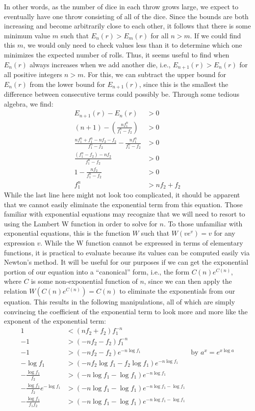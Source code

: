 \documentclass{article}
\begin{document}
In other words, as the number of dice in each throw grows large, we expect to eventually have one throw consisting of all of the dice.
Since the bounds are both increasing and become arbitrarily close to each other, it follows that there is some minimum value $m$ such that $E_n(r) > E_m(r)$ for all $n > m$.
If we could find this $m$, we would only need to check values less than it to determine which one minimizes the expected number of rolls.
Thus, it seems useful to find when $E_n(r)$ always increases when we add another die, i.e., $E_{n+1}(r) > E_n(r)$ for all positive integers $n > m$.
For this, we can subtract the upper bound for $E_n(r)$ from the lower bound for $E_{n+1}(r)$, since this is the smallest the difference between consecutive terms could possibly be.
Through some tedious algebra, we find:
\begin{align}
    E_{n+1}(r) - E_n(r) &> 0 \\
    (n + 1) - \left( \frac{nf_1^n}{f_1^n - f_2} \right) &> 0 \\
    \frac{nf_1^n + f_1^n-nf_2-f_2}{f_1^n-f_2} - \frac{nf_1^n}{f_1^n - f_2} &> 0 \\
    \frac{(f_1^n-f_2) - nf_2}{f_1^n-f_2} &> 0 \\
    1 - \frac{nf_2}{f_1^n-f_2} &> 0 \\
    f_1^n &>nf_2 + f_2
\end{align}
While the last line here might not look too complicated, it should be apparent that we cannot easily eliminate the exponential term from this equation.
Those familiar with exponential equations may recognize that we will need to resort to using the Lambert W function in order to solve for $n$.
To those unfamiliar with exponential equations, this is the function $W$ such that $W(ve^v)=v$ for any expression $v$. 
While the W function cannot be expressed in terms of elementary functions, it is practical to evaluate because its values can be computed easily via Newton's method.
It will be useful for our purposes if we can get the exponential portion of our equation into a ``canonical'' form, i.e., the form $C(n)e^{C(n)}$, where $C$ is some non-exponential function of $n$, since we can then apply the relation $W(C(n)e^{C(n)})=C(n)$ to eliminate the exponentials from our equation.
This results in the following manipulations, all of which are simply convincing the coefficient of the exponential term to look more and more like the exponent of the exponential term:
\begin{align}
    1 &< (nf_2+f_2)f_1^{-n} \\
    -1 &> (-nf_2-f_2)f_1^{-n} \\
    -1 &> (-nf_2-f_2)e^{-n\log{f_1}} & \text{by } a^x=e^{x\log{a}}\\
    -\log{f_1} &> (-nf_2\log{f_1}-f_2\log{f_1})e^{-n\log{f_1}}\\
    -\frac{\log{f_1}}{f_2} &> (-n\log{f_1}-\log{f_1})e^{-n\log{f_1}}\\
    -\frac{\log{f_1}}{f_2}e^{-\log{f_1}} &> (-n\log{f_1}-\log{f_1})e^{-n\log{f_1}-\log{f_1}}\\
    -\frac{\log{f_1}}{f_1f_2} &> (-n\log{f_1}-\log{f_1})e^{-n\log{f_1}-\log{f_1}}
\end{align}
\end{document}

